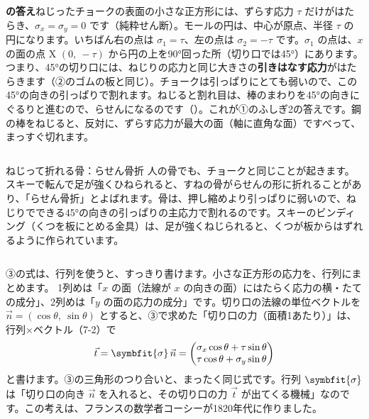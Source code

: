 \noindent\textbf{\bkhatenaref の答え}\quad ねじったチョークの表面の小さな正方形には、ずらす応力 $\tau$ だけがはたらき、$\sigma_x=\sigma_y=0$ です（純粋せん断）。モールの円は、中心が原点、半径 $\tau$ の円になります。いちばん右の点は $\sigma_1=\tau$、左の点は $\sigma_2=-\tau$ です。$\sigma_1$ の点は、$x$ の面の点 X $(0,\ -\tau)$ から円の上を90°回った所（切り口では45°）にあります。つまり、45°の切り口には、ねじりの応力と同じ大きさの\textbf{引きはなす応力}がはたらきます（②のゴムの板と同じ）。チョークは引っぱりにとても弱いので、この45°の向きの引っぱりで割れます。ねじると割れ目は、棒のまわりを45°の向きにぐるりと進むので、らせんになるのです（）。これが①のふしぎ2の答えです。鋼の棒をねじると、反対に、ずらす応力が最大の面（軸に直角な面）ですべって、まっすぐ切れます。

\begin{column}{ねじって折れる骨：らせん骨折}
人の骨でも、チョークと同じことが起きます。スキーで転んで足が強くひねられると、すねの骨がらせんの形に折れることがあり、「らせん骨折」とよばれます。骨は、押し縮めより引っぱりに弱いので、ねじりでできる45°の向きの引っぱりの主応力で割れるのです。スキーのビンディング（くつを板にとめる金具）は、足が強くねじられると、くつが板からはずれるように作られています。
\end{column}


\leavevmode\label{ph:力-9:sec5}③の式は、行列を使うと、すっきり書けます。小さな正方形の応力を、行列にまとめます。
1列めは「$x$ の面（法線が $x$ の向きの面）にはたらく応力の横・たての成分」、2列めは「$y$ の面の応力の成分」です。切り口の法線の単位ベクトルを $\vec n=(\cos\theta,\ \sin\theta)$ とすると、③で求めた「切り口の力（面積1あたり）」は、行列×ベクトル（7-2）で
\[\vec t=\symbfit{\sigma}\,\vec n=\begin{pmatrix}\sigma_x\cos\theta+\tau\sin\theta\\\tau\cos\theta+\sigma_y\sin\theta\end{pmatrix}\]
と書けます。③の三角形のつり合いと、まったく同じ式です。行列 $\symbfit{\sigma}$ は「切り口の向き $\vec n$ を入れると、その切り口の力 $\vec t$ が出てくる機械」なのです。この考えは、フランスの数学者コーシーが1820年代に作りました。

